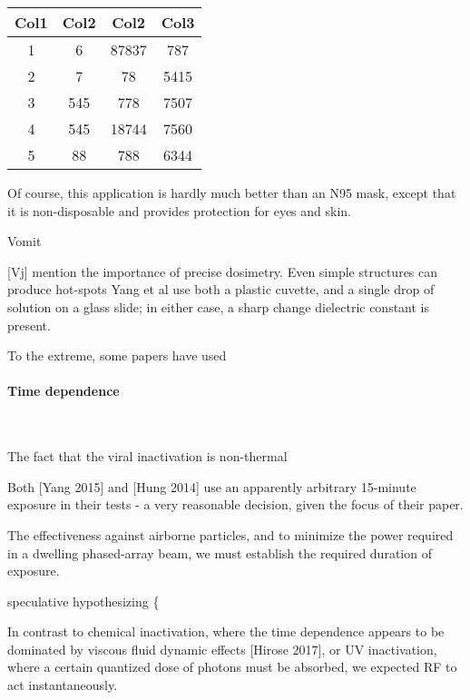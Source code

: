 \documentclass[fleqn,10pt]{article}
\begin{document}
\begin{center}
 \begin{tabular}{||c c c c||} 
 \hline
 Col1 & Col2 & Col2 & Col3 \\ [0.5ex] 
 \hline\hline
 1 & 6 & 87837 & 787 \\ 
 \hline
 2 & 7 & 78 & 5415 \\
 \hline
 3 & 545 & 778 & 7507 \\
 \hline
 4 & 545 & 18744 & 7560 \\
 \hline
 5 & 88 & 788 & 6344 \\ [1ex] 
 \hline
\end{tabular}
\end{center}





Of course, this application is hardly much better than an N95 mask, except that it is non-disposable and provides protection for eyes and skin.

Vomit


[Vj] mention the importance of precise dosimetry. Even simple structures can produce hot-spots 
Yang et al use both a plastic cuvette, and a single drop of solution on a glass slide; in either case, a sharp change dielectric constant is present.

To the extreme, some papers have used














\clearpage
\paragraph{\textbf{Time dependence}}\

The fact that the viral inactivation is non-thermal

Both [Yang 2015] and [Hung 2014] use an apparently arbitrary 15-minute exposure in their tests - a very reasonable decision, given the focus of their paper. 

The effectiveness against airborne particles, and to minimize the power required in a dwelling phased-array beam, we must establish the required duration of exposure.

{\color{red} speculative hypothesizing \{ } 

In contrast to chemical inactivation, where the time dependence appears to be dominated by viscous fluid dynamic effects [Hirose 2017], or UV inactivation, where a certain quantized dose of photons must be absorbed, we expected RF to act instantaneously.
\end{document}
